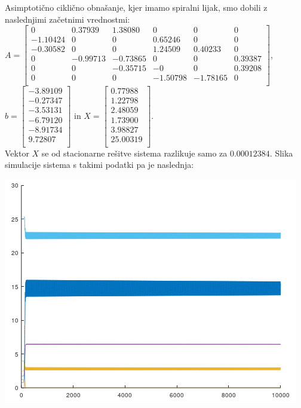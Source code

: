 \documentclass[a4paper, 12pt]{article}
\begin{document}
Asimptotično ciklično obnašanje, kjer imamo spiralni lijak, smo dobili z naslednjimi začetnimi vrednostmi:\\
$ A =
\begin{bmatrix}
	0 & 0.37939 & 1.38080 & 0 & 0 & 0 \\
	-1.10424 & 0 & 0 & 0.65246 & 0 & 0 \\
	-0.30582 & 0 & 0 & 1.24509 & 0.40233 & 0 \\
	0 & -0.99713 & -0.73865 & 0 & 0 & 0.39387 \\
	0 & 0 & -0.35715 & -0 & 0 & 0.39208 \\
	0 & 0 & 0 & -1.50798 & -1.78165 & 0 \\
\end{bmatrix} $, \\
$ b =
\begin{bmatrix}
	-3.89109 \\
	-0.27347 \\
	-3.53131 \\
	-6.79120 \\
	-8.91734 \\
	9.72807 \\
\end{bmatrix} $ in
$ X =
\begin{bmatrix}
	0.77988 \\
	1.22798 \\
	2.48059 \\
	1.73900 \\
	3.98827 \\
	25.00319 \\
\end{bmatrix} $. \\
Vektor $ X $ se od stacionarne rešitve sistema razlikuje samo za $ 0.00012384 $. Slika simulacije
sistema s takimi podatki pa je naslednja:
\begin{center}
	\includegraphics{asimptotic_cyclic_sink.png}
\end{center}
\end{document}
